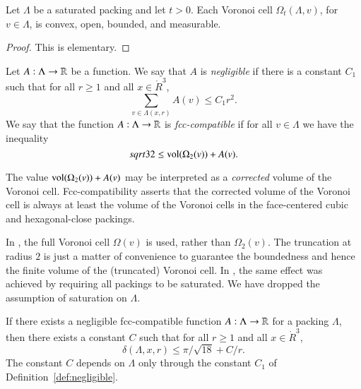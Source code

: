 \begin{lemma} Let $\Lambda$ be a saturated packing and let $t>0$.
Each Voronoi cell $\Omega_t(\Lambda,v)$, for $v\in\Lambda$, is
convex, open, bounded, and measurable.
\end{lemma}

\begin{proof}  This is elementary.
\end{proof}

\begin{definition}[negligible]\label{def:negligible}
Let $A:\Lambda\to{\mathbb R}$ be a function.  We say that $A$
is
  {\it negligible\/}
if there is a constant $C_1$ such that for all $r\ge1$ and all
$x\in\ring{R}^3$,
   $$\sum_{v\in\Lambda(x,r)} A(v) \le C_1 r^2.$$
We say that the function $A:\Lambda\to{\mathbb R}$ is
  {\it fcc-compatible\/}
if for all $v\in\Lambda$ we have the inequality
$$sqrt{32}\le {\operatorname{vol}}(\Omega_2(v)) + A(v).$$
\end{definition}





\begin{remark}
The value ${\operatorname{vol}}(\Omega_2(v)) + A(v)$ may be interpreted as a
{\it corrected\/} volume of the Voronoi
cell. Fcc-compatibility asserts that the corrected volume of the
Voronoi cell is always at least the volume of the Voronoi cells in
the face-centered cubic and hexagonal-close packings.
\end{remark}

\begin{remark} In \cite{DCG}, the full Voronoi cell $\Omega(v)$
is used, rather than $\Omega_2(v)$.  The truncation at radius $2$
is just a matter of convenience to guarantee the boundedness
and hence the finite volume of the (truncated) Voronoi cell.
In \cite{DCG}, the same effect was achieved by requiring all packings
to be saturated.  We have dropped the assumption of saturation
on $\Lambda$.
\end{remark}


\begin{lemma}
\label{lemma:deltabound} If there exists a 
negligible  fcc-compatible function
$A:\Lambda\to{\mathbb R}$ for a 
packing $\Lambda$, then there
exists a constant $C$ such that for all $r\ge1$ and all
$x\in\ring{R}^3$,
    $$
    \delta(\Lambda,x,r)
    \le \pi/\sqrt{18} + C/r.
    $$
The constant $C$ depends on $\Lambda$ only through the constant
$C_1$ of Definition~\ref{def:negligible}.
\end{lemma}



